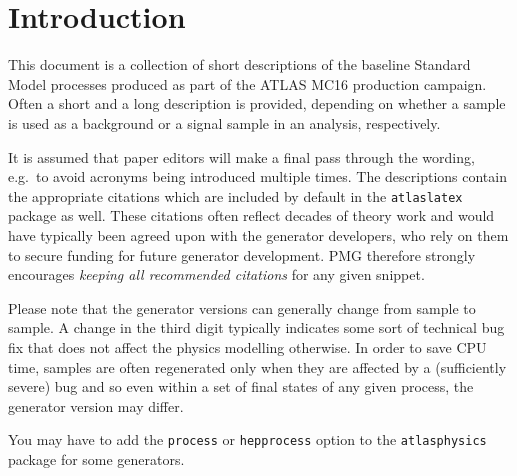 \documentclass[NOTE, atlasdraft=false, UKenglish, texlive=2016]{atlasdoc}
\author{The ATLAS Collaboration}
\begin{document}
\maketitle

\tableofcontents

\section{Introduction}

This document is a collection of short descriptions of the baseline Standard Model processes
produced as part of the ATLAS MC16 production campaign. Often a short and a long description 
is provided, depending on whether a sample is used as a background or a signal sample in an
analysis, respectively.

It is assumed that paper editors will make a final pass through the wording, e.g.\ to avoid
acronyms being introduced multiple times.
The descriptions contain the appropriate citations which are included by default in 
the \texttt{atlaslatex} package as well.
These citations often reflect decades of theory work and would have typically been agreed upon 
with the generator developers, who rely on them to secure funding for future generator development.
PMG therefore strongly encourages \emph{keeping all recommended citations} for any given snippet.

Please note that the generator versions can generally change from sample to sample. 
A change in the third digit typically indicates some sort of technical bug fix that
does not affect the physics modelling otherwise. 
In order to save CPU time, samples are often regenerated only when they are affected 
by a (sufficiently severe) bug and so even within a set of final states 
of any given process, the generator version may differ.

You may have to add the \texttt{process} or \texttt{hepprocess} option to the \texttt{atlasphysics} package for some generators.


%









\printbibliography
\end{document}
